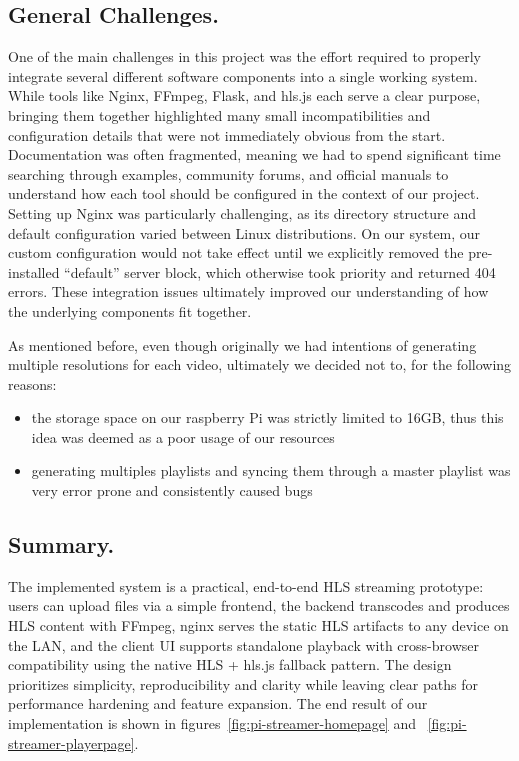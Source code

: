 \documentclass[11pt]{article}
\begin{document}
\subsection{General Challenges.}
One of the main challenges in this project was the effort required to properly integrate several different software components into a single working system. While tools like Nginx, FFmpeg, Flask, and hls.js each serve a clear purpose, bringing them together highlighted many small incompatibilities and configuration details that were not immediately obvious from the start. Documentation was often fragmented, meaning we had to spend significant time searching through examples, community forums, and official manuals to understand how each tool should be configured in the context of our project. Setting up Nginx was particularly challenging, as its directory structure and default configuration varied between Linux distributions. On our system, our custom configuration would not take effect until we explicitly removed the pre-installed “default” server block, which otherwise took priority and returned 404 errors. These integration issues ultimately improved our understanding of how the underlying components fit together.

As mentioned before, even though originally we had intentions of generating multiple resolutions for each video, ultimately we decided not to, for the following reasons:
\begin{itemize}
    \item the storage space on our raspberry Pi was strictly limited to 16GB, thus this idea was deemed as a poor usage of our resources
    \item generating multiples playlists and syncing them through a master playlist was very error prone and consistently caused bugs
\end{itemize}

\subsection{Summary.}
The implemented system is a practical, end-to-end HLS streaming prototype: users can upload files via a simple frontend, the backend transcodes and produces HLS content with FFmpeg, nginx serves the static HLS artifacts to any device on the LAN, and the client UI supports standalone playback with cross-browser compatibility using the native HLS + hls.js fallback pattern. The design prioritizes simplicity, reproducibility and clarity while leaving clear paths for performance hardening and feature expansion. The end result of our implementation is shown in figures~\ref{fig:pi-streamer-homepage} and ~\ref{fig:pi-streamer-playerpage}.
\end{document}

